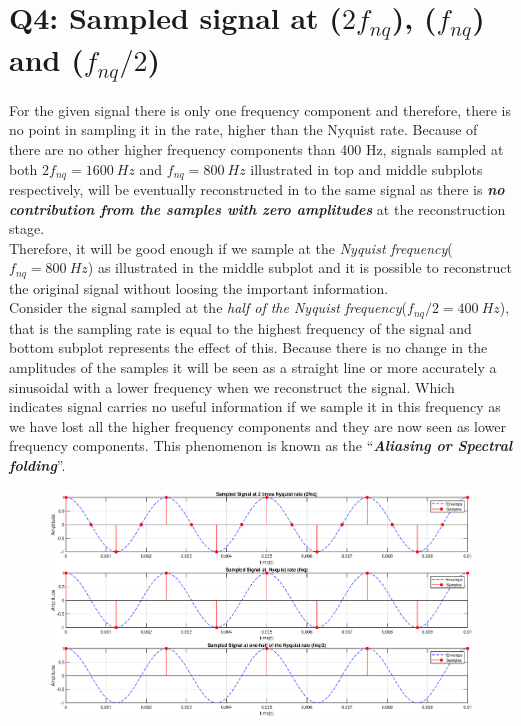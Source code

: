\documentclass[a4paper,11pt]{article}%
\begin{document}
\section*{Q4: Sampled signal at ($2f_{nq}$), ($f_{nq}$) and ($f_{nq}/2$) }

For the given signal there is only one frequency component and therefore, there is no point in sampling it in the rate, higher than the Nyquist rate. Because of there are no other higher frequency components than 400 Hz,  signals sampled at both  $2f_{nq} = 1600 ~Hz$ and  $f_{nq} = 800~ Hz$ illustrated in top and middle subplots respectively, will be eventually reconstructed in to the same signal as there is \textbf{\textit{no contribution from the samples with zero amplitudes}} at the reconstruction stage.\\

Therefore, it will be good enough if we sample at the \textit{Nyquist frequency}($f_{nq} = 800~Hz$) as illustrated in the middle subplot and it is possible to reconstruct the original signal without loosing the important information.\\

Consider the signal sampled at the \textit{half of the Nyquist frequency}($f_{nq}/2 = 400~Hz$), that is the sampling rate is equal to the highest frequency of the signal and bottom subplot represents the effect of this. Because there is no change in the amplitudes of the samples it will be seen as a straight line or more accurately a sinusoidal with a lower frequency when we reconstruct the signal. Which indicates signal carries no useful information if we sample it in this frequency as we have lost all the higher frequency components and they are now seen as lower frequency components. This phenomenon is known as the ``\textbf{\textit{Aliasing or Spectral folding}}''.\\

\begin{figure}[!h]
	\centering
	\includegraphics[scale=0.45]{figures/q4}
\end{figure}
\end{document}
